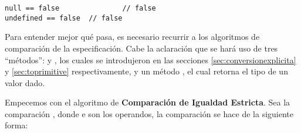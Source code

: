 \begin{lstlisting}[title={Comparando \code{null} y \code{undefined} con \code{false}}]
null == false				// false
undefined == false	// false
\end{lstlisting}

Para entender mejor qué pasa, es necesario recurrir a los algoritmos de comparación de la especificación. Cabe la aclaración que se hará uso de tres "`métodos"':  y , los cuales se introdujeron en las secciones \ref{sec:conversionexplicita} y \ref{sec:toprimitive} respectivamente, y un método , el cual retorna el tipo de un valor dado. 

Empecemos con el algoritmo de \textbf{Comparación de Igualdad Estricta}. Sea la comparación , donde  e  son los operandos, la comparación se hace de la siguiente forma:

